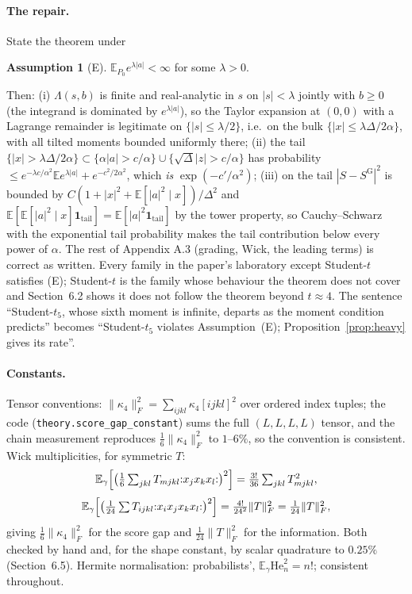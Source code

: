 \documentclass[11pt,a4paper]{article}
\newcommand{\Frob}[1]{\lVert #1 \rVert_{F}}
\newcommand{\Hen}[1]{\mathrm{He}_{#1}}
\newcommand{\E}{\mathbb{E}}
\newcommand{\Sg}{S^{\mathrm{G}}}
\theoremstyle{definition}
\newtheorem{assumption}[theorem]{Assumption}
\theoremstyle{remark}
\begin{document}
\paragraph{The repair.} State the theorem under
\begin{assumption}[E]
$\E_{P_0}e^{\lambda|a|}<\infty$ for some $\lambda>0$.
\end{assumption}
Then: (i) $\Lambda(s,b)$ is finite and real-analytic in $s$ on $|s|<\lambda$ jointly with $b\ge0$ (the integrand is dominated by $e^{\lambda|a|}$), so the Taylor expansion at $(0,0)$ with a Lagrange remainder is legitimate on $\{|s|\le\lambda/2\}$, i.e.\ on the bulk $\{|x|\le\lambda\Delta/2\alpha\}$, with all tilted moments bounded uniformly there; (ii) the tail $\{|x|>\lambda\Delta/2\alpha\}\subset\{\alpha|a|>c/\alpha\}\cup\{\sqrt\Delta|z|>c/\alpha\}$ has probability $\le e^{-\lambda c/\alpha^2}\E e^{\lambda|a|}+e^{-c^2/2\alpha^2}$, which \emph{is} $\exp(-c'/\alpha^2)$; (iii) on the tail $|S-\Sg|^2$ is bounded by $C(1+|x|^2+\E[|a|^2\mid x])/\Delta^2$ and $\E[\E[|a|^2\mid x]\mathbf 1_{\text{tail}}]=\E[|a|^2\mathbf 1_{\text{tail}}]$ by the tower property, so Cauchy--Schwarz with the exponential tail probability makes the tail contribution below every power of $\alpha$. The rest of Appendix A.3 (grading, Wick, the leading terms) is correct as written. Every family in the paper's laboratory except Student-$t$ satisfies (E); Student-$t$ is the family whose behaviour the theorem does not cover and Section~6.2 shows it does not follow the theorem beyond $t\approx4$. The sentence ``Student-$t_5$, whose sixth moment is infinite, departs as the moment condition predicts'' becomes ``Student-$t_5$ violates Assumption~(E); Proposition~\ref{prop:heavy} gives its rate''.

\paragraph{Constants.} Tensor conventions: $\Frob{\kappa_4}^2=\sum_{ijkl}\kappa_4[ijkl]^2$ over ordered index tuples; the code (\texttt{theory.score\_gap\_constant}) sums the full $(L,L,L,L)$ tensor, and the chain measurement reproduces $\tfrac16\Frob{\kappa_4}^2$ to $1$--$6\%$, so the convention is consistent. Wick multiplicities, for symmetric $T$:
\[
\E_\gamma\Bigl[\bigl(\tfrac16\textstyle\sum_{jkl}T_{mjkl}{:}x_jx_kx_l{:}\bigr)^2\Bigr]=\tfrac{3!}{36}\sum_{jkl}T_{mjkl}^2,
\]
\[
\E_\gamma\Bigl[\bigl(\tfrac1{24}\textstyle\sum T_{ijkl}{:}x_ix_jx_kx_l{:}\bigr)^2\Bigr]=\tfrac{4!}{24^2}\Frob{T}^2=\tfrac1{24}\Frob{T}^2,
\]
giving $\tfrac16\Frob{\kappa_4}^2$ for the score gap and $\tfrac1{24}\Frob{T}^2$ for the information. Both checked by hand and, for the shape constant, by scalar quadrature to $0.25\%$ (Section~6.5). Hermite normalisation: probabilists', $\E_\gamma\Hen{n}^2=n!$; consistent throughout.
\end{document}
